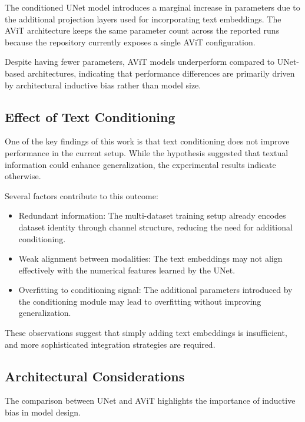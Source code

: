 \documentclass[
]{article}
\providecommand{\tightlist}{%
  \setlength{\itemsep}{0pt}\setlength{\parskip}{0pt}}
\begin{document}
The conditioned UNet model introduces a marginal increase in parameters
due to the additional projection layers used for incorporating text
embeddings. The AViT architecture keeps the same parameter count across
the reported runs because the repository currently exposes a single AViT
configuration.

Despite having fewer parameters, AViT models underperform compared to
UNet-based architectures, indicating that performance differences are
primarily driven by architectural inductive bias rather than model size.

\subsection{Effect of Text
Conditioning}\label{effect-of-text-conditioning}

One of the key findings of this work is that text conditioning does not
improve performance in the current setup. While the hypothesis suggested
that textual information could enhance generalization, the experimental
results indicate otherwise.

Several factors contribute to this outcome:

\begin{itemize}
\tightlist
\item
  Redundant information: The multi-dataset training setup already
  encodes dataset identity through channel structure, reducing the need
  for additional conditioning.
\item
  Weak alignment between modalities: The text embeddings may not align
  effectively with the numerical features learned by the UNet.
\item
  Overfitting to conditioning signal: The additional parameters
  introduced by the conditioning module may lead to overfitting without
  improving generalization.
\end{itemize}

These observations suggest that simply adding text embeddings is
insufficient, and more sophisticated integration strategies are
required.

\subsection{Architectural
Considerations}\label{architectural-considerations}

The comparison between UNet and AViT highlights the importance of
inductive bias in model design.
\end{document}
